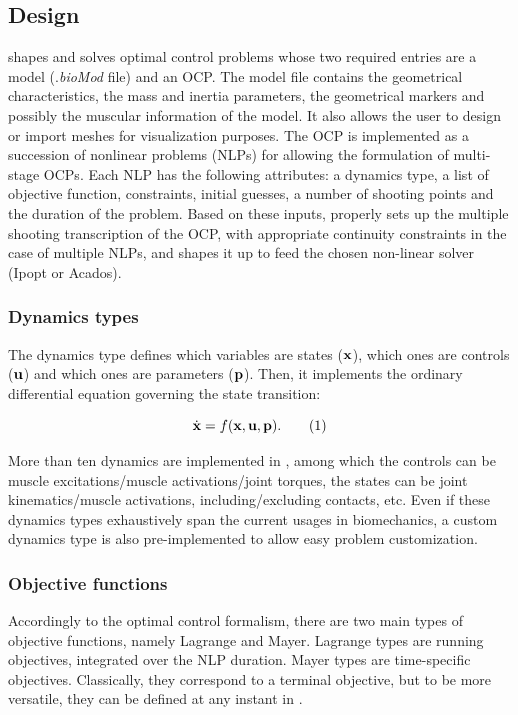 \subsection{Design}
\bioptim shapes and solves optimal control problems whose two required entries are a model (.\textit{bioMod} file) and an OCP.
The model file contains the geometrical characteristics, the mass and inertia parameters, the geometrical markers and possibly the muscular information of the model. 
It also allows the user to design or import meshes for visualization purposes.
The OCP is implemented as a succession of nonlinear problems (NLPs) for allowing the formulation of multi-stage OCPs. Each NLP has the following attributes: a dynamics type, a list of objective function, constraints, initial guesses, a number of shooting points and the duration of the problem.
Based on these inputs, \bioptim properly sets up the multiple shooting transcription of the OCP, with appropriate continuity constraints in the case of multiple NLPs, and shapes it up to feed the chosen non-linear solver (Ipopt or Acados). 

\subsubsection{Dynamics types}
The dynamics type defines which variables are states ($\mathbf{x}$), which ones are controls ($\mathbf{u}$) and which ones are parameters ($\mathbf{p}$).
Then, it implements the ordinary differential equation governing the state transition:

\[
\dstate = f(\state, \control, \param).
\addtag
\label{eq:state_transition}
\]

\noindent More than ten dynamics are implemented in \bioptim , among which the controls can be muscle excitations/muscle activations/joint torques, the states can be joint kinematics/muscle activations, including/excluding contacts, etc.
Even if these dynamics types exhaustively span the current usages in biomechanics, a custom dynamics type is also pre-implemented to allow easy problem customization.

\subsubsection{Objective functions}
Accordingly to the optimal control formalism, there are two main types of objective functions, namely Lagrange and Mayer. Lagrange types are running objectives, integrated over the NLP duration. Mayer types are time-specific objectives. Classically, they correspond to a terminal objective, but to be more versatile, they can be defined at any instant in \bioptim.

